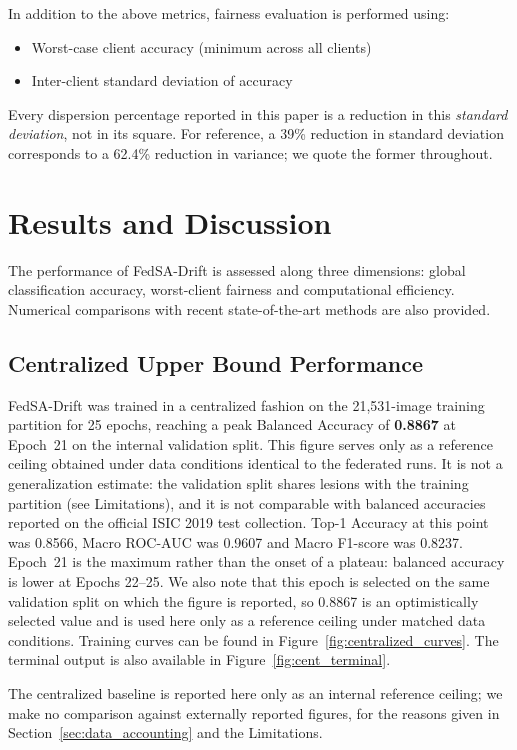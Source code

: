 \documentclass{ieeeaccess}
\newcommand{\sadrift}{FedSA-Drift}
\begin{document}
In addition to the above metrics, fairness evaluation is performed using:
\begin{itemize}
    \item Worst-case client accuracy (minimum across all clients)
    \item Inter-client standard deviation of accuracy
\end{itemize}
Every dispersion percentage reported in this paper is a reduction in this \emph{standard deviation}, not in its square. For reference, a 39\% reduction in standard deviation corresponds to a 62.4\% reduction in variance; we quote the former throughout.

\section{Results and Discussion}

The performance of \sadrift{} is assessed along three dimensions: global classification accuracy, worst-client fairness and computational efficiency. Numerical comparisons with recent state-of-the-art methods are also provided.

\subsection{Centralized Upper Bound Performance}

\sadrift{} was trained in a centralized fashion on the 21,531-image training partition for 25 epochs, reaching a peak Balanced Accuracy of \textbf{0.8867} at Epoch~21 on the internal validation split. This figure serves only as a reference ceiling obtained under data conditions identical to the federated runs. It is not a generalization estimate: the validation split shares lesions with the training partition (see Limitations), and it is not comparable with balanced accuracies reported on the official ISIC 2019 test collection. Top-1 Accuracy at this point was 0.8566, Macro ROC-AUC was 0.9607 and Macro F1-score was 0.8237. Epoch~21 is the maximum rather than the onset of a plateau: balanced accuracy is lower at Epochs 22--25. We also note that this epoch is selected on the same validation split on which the figure is reported, so 0.8867 is an optimistically selected value and is used here only as a reference ceiling under matched data conditions. Training curves can be found in Figure~\ref{fig:centralized_curves}. The terminal output is also available in Figure~\ref{fig:cent_terminal}.

The centralized baseline is reported here only as an internal reference ceiling; we make no comparison against externally reported figures, for the reasons given in Section~\ref{sec:data_accounting} and the Limitations.
\end{document}
